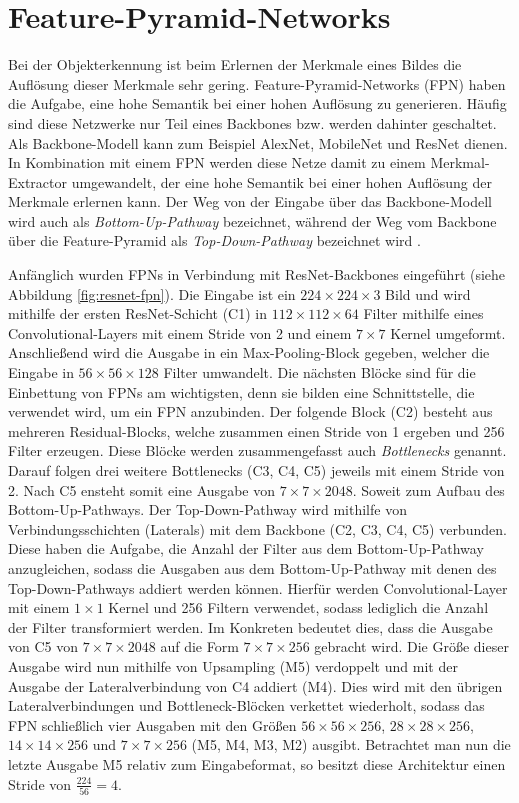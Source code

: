 \section{Feature-Pyramid-Networks}
Bei der Objekterkennung ist beim Erlernen der Merkmale eines Bildes die
Auflösung dieser Merkmale sehr gering. Feature-Pyramid-Networks (FPN) haben die
Aufgabe, eine hohe Semantik bei einer hohen Auflösung zu generieren. Häufig sind
diese Netzwerke nur Teil eines Backbones bzw. werden dahinter geschaltet. Als
Backbone-Modell kann zum Beispiel AlexNet, MobileNet und ResNet dienen. In
Kombination mit einem FPN werden diese Netze damit zu einem Merkmal-Extractor
umgewandelt, der eine hohe Semantik bei einer hohen Auflösung der Merkmale
erlernen kann. Der Weg von der Eingabe über das Backbone-Modell wird auch als
\textit{Bottom-Up-Pathway} bezeichnet, während der Weg vom Backbone über die
Feature-Pyramid als \textit{Top-Down-Pathway} bezeichnet wird
\cite{lin2017feature}.

Anfänglich wurden FPNs in Verbindung mit ResNet-Backbones eingeführt (siehe
Abbildung \ref{fig:resnet-fpn}). Die Eingabe ist ein $224 \times 224 \times 3$
Bild und wird mithilfe der ersten ResNet-Schicht (C1) in $112 \times 112 \times
64$ Filter mithilfe eines Convolutional-Layers mit einem Stride von 2 und einem
$7 \times 7$ Kernel umgeformt. Anschließend wird die Ausgabe in ein
Max-Pooling-Block gegeben, welcher die Eingabe in $56 \times 56 \times 128$
Filter umwandelt. Die nächsten Blöcke sind für die Einbettung von FPNs am
wichtigsten, denn sie bilden eine Schnittstelle, die verwendet wird, um ein FPN anzubinden. Der folgende Block (C2) besteht aus mehreren Residual-Blocks,
welche zusammen einen Stride von 1 ergeben und 256 Filter erzeugen. Diese Blöcke
werden zusammengefasst auch \textit{Bottlenecks} genannt. Darauf folgen drei
weitere Bottlenecks (C3, C4, C5) jeweils mit einem Stride von 2. Nach C5 ensteht
somit eine Ausgabe von $7 \times 7 \times 2048$. Soweit zum Aufbau des
Bottom-Up-Pathways. Der Top-Down-Pathway wird mithilfe von Verbindungsschichten
(Laterals) mit dem Backbone (C2, C3, C4, C5) verbunden. Diese haben die Aufgabe, die Anzahl der
Filter aus dem Bottom-Up-Pathway anzugleichen, sodass die Ausgaben aus dem Bottom-Up-Pathway mit denen des Top-Down-Pathways addiert werden können. Hierfür werden
Convolutional-Layer mit einem $1 \times 1$ Kernel und 256 Filtern verwendet,
sodass lediglich die Anzahl der Filter transformiert werden. Im Konkreten
bedeutet dies, dass die Ausgabe von C5 von $7 \times 7 \times 2048$ auf die Form
$7 \times 7 \times 256$ gebracht wird.  Die Größe dieser Ausgabe wird nun
mithilfe von Upsampling (M5) verdoppelt und mit der Ausgabe der
Lateralverbindung von C4 addiert (M4). Dies wird mit den übrigen
Lateralverbindungen und Bottleneck-Blöcken verkettet wiederholt, sodass das FPN
schließlich vier Ausgaben mit den Größen $56 \times 56 \times 256$, $28 \times
28 \times 256$, $14 \times 14 \times 256$ und $7 \times 7 \times 256$ (M5, M4,
M3, M2) ausgibt. Betrachtet man nun die letzte Ausgabe M5 relativ zum
Eingabeformat, so besitzt diese Architektur einen Stride von $\frac{224}{56} = 4$.

